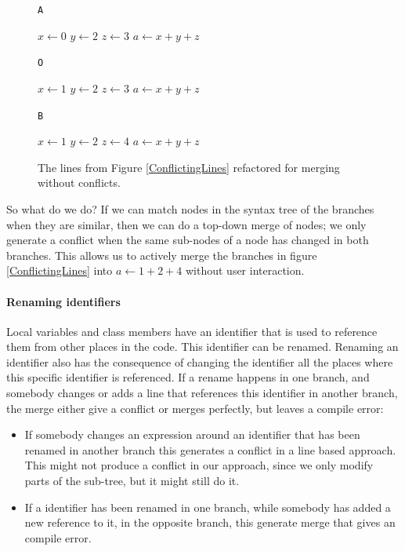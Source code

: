 \documentclass[11pt]{article}
\begin{document}
\begin{figure}
\begin{multicols*}{3}

\texttt{A}

\begin{algorithmic}
	\State $x \gets 0$
	\State $y \gets 2$
	\State $z \gets 3$
	\State $a \gets x+y+z$
\end{algorithmic}

\columnbreak

\texttt{O}

\begin{algorithmic}
	\State $x \gets 1$
	\State $y \gets 2$
	\State $z \gets 3$
	\State $a \gets x+y+z$
\end{algorithmic}

\columnbreak

\texttt{B}
 
\begin{algorithmic}
	\State $x \gets 1$
	\State $y \gets 2$
	\State $z \gets 4$
	\State $a \gets x+y+z$
\end{algorithmic}

\end{multicols*}
\caption{The lines from Figure \ref{ConflictingLines} refactored for merging without conflicts.}
\label{RefactoredForNoConflict}
\end{figure}

So what do we do? If we can match nodes in the syntax tree of the branches when they are similar, then we can do a top-down merge of nodes; we only generate a conflict when the same sub-nodes of a node has changed in both branches. This allows us to actively merge the branches in figure \ref{ConflictingLines} into $a \gets 1+2+4$ without user interaction.

\paragraph{Renaming identifiers} Local variables and class members have an identifier that is used to reference them from other places in the code. This identifier can be renamed. Renaming an identifier also has the consequence of changing the identifier all the places where this specific identifier is referenced. If a rename happens in one branch, and somebody changes or adds a line that references this identifier in another branch, the merge either give a conflict or merges perfectly, but leaves a compile error: 

\begin{itemize}
\item If somebody changes an expression around an identifier that has been renamed in another branch this generates a conflict in a line based approach. This might not produce a conflict in our approach, since we only modify parts of the sub-tree, but it might still do it.
\item If a identifier has been renamed in one branch, while somebody has added a new reference to it, in the opposite branch, this generate merge that gives an compile error.
\end{itemize}
\end{document}
